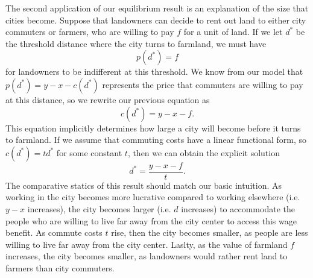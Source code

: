 The second application of our equilibrium result is an explanation of the size that cities become. Suppose that landowners can decide to rent out land to either city commuters or farmers, who are willing to pay $f$ for a unit of land. If we let $d^*$ be the threshold distance where the city turns to farmland, we must have
$$p(d^*) = f$$
for landowners to be indifferent at this threshold. We know from our model that $p(d^*) = y - x - c(d^*)$ represents the price that commuters are willing to pay at this distance, so we rewrite our previous equation as
$$c(d^*) = y - x - f.$$
This equation implicitly determines how large a city will become before it turns to farmland. If we assume that commuting costs have a linear functional form, so $c(d^*) = td^*$ for some constant $t$, then we can obtain the explicit solution
$$d^* = \frac{y-x-f}{t}.$$
The comparative statics of this result should match our basic intuition. As working in the city becomes more lucrative compared to working elsewhere (i.e. $y-x$ increases), the city becomes larger (i.e. $d$ increases) to accommodate the people who are willing to live far away from the city center to access this wage benefit. As commute costs $t$ rise, then the city becomes smaller, as people are less willing to live far away from the city center. Laslty, as the value of farmland $f$ increases, the city becomes smaller, as landowners would rather rent land to farmers than city commuters. 


